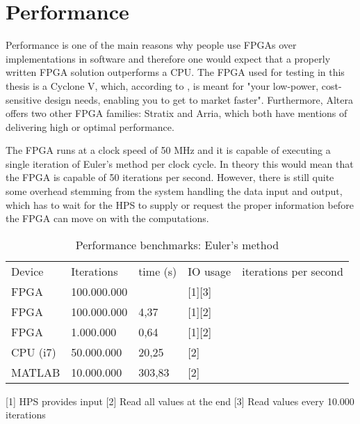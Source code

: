 \section{Performance}
Performance is one of the main reasons why people use FPGAs over implementations in software and therefore one would expect that a properly written FPGA solution outperforms a CPU. The FPGA used for testing in this thesis is a Cyclone V, which, according to \cite{AlteraFPGA}, is meant for "your low-power, cost-sensitive design needs, enabling you to get to market faster". Furthermore, Altera offers two other FPGA families: Stratix and Arria, which both have mentions of delivering high or optimal performance. 


The FPGA runs at a clock speed of 50 MHz and it is capable of executing a single iteration of Euler's method per clock cycle. In theory this would mean that the FPGA is capable of 50 iterations per second. However, there is still quite some overhead stemming from the system handling the data input and output, which has to wait for the HPS to supply or request the proper information before the FPGA can move on with the computations.

\begin{table}
	\caption{Performance benchmarks: Euler's method}
	\label{t:perfomance}
	\begin{tabular}{l l l l l}
		Device 	& Iterations 	& time (s)	& IO usage	& iterations per second \\  
		FPGA 	& 100.000.000 	& 			& [1][3]	& \\
		FPGA 	& 100.000.000 	& 4,37		& [1][2] 	& \\
		FPGA 	& 1.000.000 	& 0,64		& [1][2] 	& \\
		CPU (i7)& 50.000.000 	& 20,25		& [2] 		& \\
		MATLAB 	& 10.000.000 	& 303,83	& [2] 		& \\
	\end{tabular}
\end{table}

[1] HPS provides input
[2] Read all values at the end
[3] Read values every 10.000 iterations





